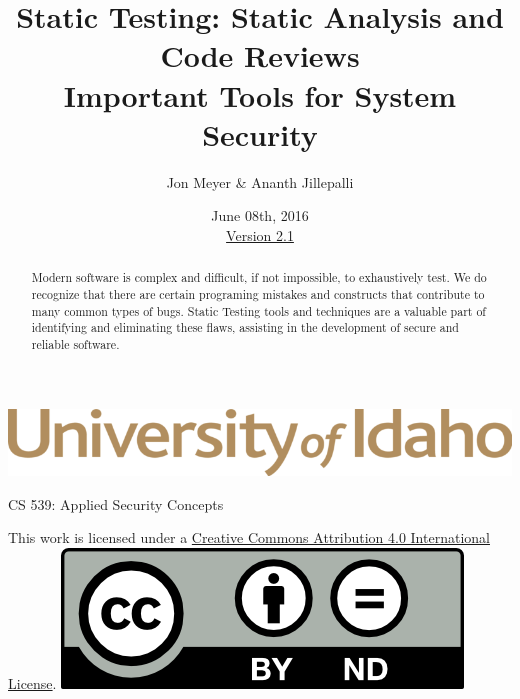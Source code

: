 \documentclass[12pt]{extarticle}
\begin{document}
\title{ Static Testing: Static Analysis and Code Reviews \\ \large Important Tools for System Security}
\author{Jon Meyer \& Ananth Jillepalli}
\date{June 08th, 2016 \\ \hyperref[changelog]{Version 2.1}} %
\renewcommand{\abstractname}{Summary}
\begin{titlepage}
\maketitle
{}
\begin{center}
\includegraphics[scale=.30]{UofI}

\large{CS 539: Applied Security Concepts}

\vskip 40pt

\end{center}
\begin{abstract}
Modern software is complex and difficult, if not impossible, to exhaustively test.  We do recognize that there are certain programing mistakes and constructs that contribute to many common types of bugs.  Static Testing tools and techniques are a valuable part of identifying and eliminating these flaws, assisting in the development of secure and reliable software.
\end{abstract}


\vfill
\begin{center}
This work is licensed under a \href{http://creativecommons.org/licenses/by/4.0/}{Creative Commons Attribution 4.0 International License}.
\vskip 10pt
\includegraphics[scale=.5]{cc}
\end{center}

\end{titlepage}


\pagebreak
\tableofcontents
\end{document}
